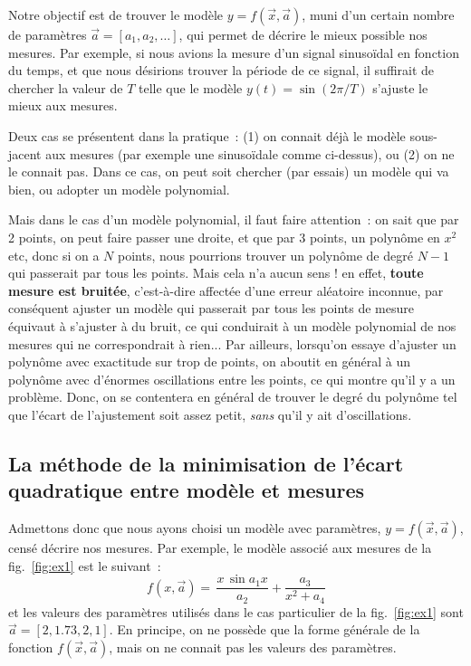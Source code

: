 Notre objectif est de trouver le modèle $y=f(\vec{x},\vec{a})$, muni d'un certain nombre de paramètres $\vec{a}=[a_1,a_2,\dots]$, qui permet de décrire le mieux possible nos mesures. Par exemple, si nous avions la mesure d'un signal sinusoïdal en fonction du temps, et que nous désirions trouver la période de ce signal, il suffirait de chercher la valeur de $T$ telle que le modèle $y(t)=\sin{(2\pi/T)}$ s'ajuste le mieux aux mesures.

Deux cas se présentent dans la pratique~: (1) on connait déjà le modèle sous-jacent aux mesures (par exemple une sinusoïdale comme ci-dessus), ou (2) on ne le connait pas. Dans ce cas, on peut soit chercher (par essais) un modèle qui va bien, ou adopter un modèle polynomial.

Mais dans le cas d'un modèle polynomial, il faut faire attention~: on sait que par 2 points, on peut faire passer une droite, et que par 3 points, un polynôme en $x^2$ etc, donc si on a $N$ points, nous pourrions trouver un polynôme de degré $N-1$ qui passerait par tous les points. Mais cela n'a aucun sens ! en effet, \textbf{toute mesure est bruitée}, c'est-à-dire affectée d'une erreur aléatoire inconnue, par conséquent ajuster un modèle qui passerait par tous les points de mesure équivaut à s'ajuster à du bruit, ce qui conduirait à un modèle polynomial de nos mesures qui ne correspondrait à rien... Par ailleurs, lorsqu'on essaye d'ajuster un polynôme avec exactitude sur trop de points, on aboutit en général à un polynôme avec d'énormes oscillations entre les points, ce qui montre qu'il y a un problème. Donc, on se contentera en général de trouver le degré du polynôme tel que l'écart de l'ajustement soit assez petit, \textit{sans} qu'il y ait d'oscillations.

\subsection{La méthode de la minimisation de l'écart quadratique entre modèle et mesures}

Admettons donc que nous ayons choisi un modèle avec paramètres, $y=f(\vec{x},\vec{a})$, censé décrire nos mesures. Par exemple, le modèle associé aux mesures de la fig.~\ref{fig:ex1} est le suivant~:
\begin{equation}
f(x,\vec{a})=\,\frac{x\,\sin{a_1x}}{a_2}+\frac{a_3}{x^2+a_4}
\end{equation}
et les valeurs des paramètres utilisés dans le cas particulier de la fig.~\ref{fig:ex1} sont $\vec{a}=[2,1.73,2,1]$. En principe, on ne possède que la forme générale de la fonction $f(\vec{x},\vec{a})$, mais on ne connait pas les valeurs des paramètres.

